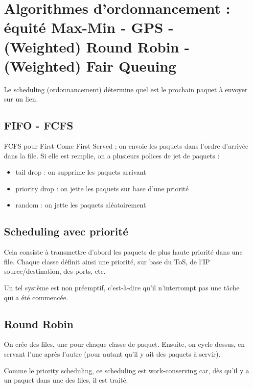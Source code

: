\chapter{Algorithmes d'ordonnancement : équité Max-Min - GPS - (Weighted) Round Robin - (Weighted) Fair Queuing}

Le scheduling (ordonnancement) détermine quel est le prochain paquet à envoyer sur un lien.
		
			\section{FIFO - FCFS}
			
			FCFS pour First Come First Served ; on envoie les paquets dans l'ordre d'arrivée dans la file. Si elle est remplie, on a plusieurs polices de jet de paquets :
			
			\begin{itemize}
				\item tail drop : on supprime les paquets arrivant
				\item priority drop : on jette les paquets sur base d'une priorité
				\item random : on jette les paquets aléatoirement
			\end{itemize}
			
			\section{Scheduling avec priorité}
			
			Cela consiste à transmettre d'abord les paquets de plus haute priorité dans une file. Chaque classe définit ainsi une priorité, sur base du ToS, de l'IP source/destination, des ports, etc.
			
			
			Un tel système est non préemptif, c'est-à-dire qu'il n'interrompt pas une tâche qui a été commencée.
			
			\section{Round Robin}

			On crée des files, une pour chaque classe de paquet. Ensuite, on cycle dessus, en servant l'une après l'autre (pour autant qu'il y ait des paquets à servir).

		
			Comme le priority scheduling, ce scheduling est work-conserving car, dès qu'il y a un paquet dans une des files, il est traité. 
			
